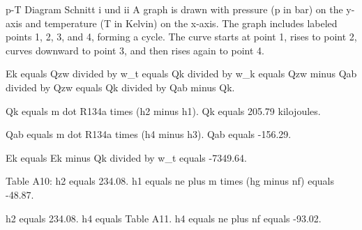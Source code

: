 p-T Diagram Schnitt i und ii  
A graph is drawn with pressure (p in bar) on the y-axis and temperature (T in Kelvin) on the x-axis. The graph includes labeled points 1, 2, 3, and 4, forming a cycle. The curve starts at point 1, rises to point 2, curves downward to point 3, and then rises again to point 4.

Ek equals Qzw divided by w_t equals Qk divided by w_k equals Qzw minus Qab divided by Qzw equals Qk divided by Qab minus Qk.  

Qk equals m dot R134a times (h2 minus h1).  
Qk equals 205.79 kilojoules.  

Qab equals m dot R134a times (h4 minus h3).  
Qab equals -156.29.  

Ek equals Ek minus Qk divided by w_t equals -7349.64.  

Table A10:  
h2 equals 234.08.  
h1 equals ne plus m times (hg minus nf) equals -48.87.  

h2 equals 234.08.  
h4 equals Table A11.  
h4 equals ne plus nf equals -93.02.